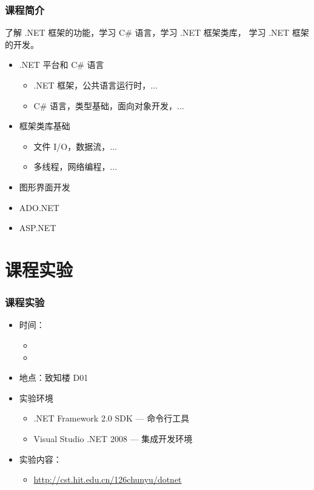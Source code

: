 \begin{frame}
\frametitle{课程简介}

\CJKindent 了解 .NET 框架的功能，学习 C\# 语言，学习 .NET 框架类库， 学习
.NET 框架的开发。

\begin{itemize}
\item .NET 平台和 C\# 语言
\begin{itemize}
\item .NET 框架，公共语言运行时，$\ldots$
\item C\# 语言，类型基础，面向对象开发，$\ldots$
\end{itemize}
\item 框架类库基础
  \begin{itemize}
  \item 文件 I/O，数据流，$\ldots$
  \item 多线程，网络编程，$\ldots$
  \end{itemize}
\item 图形界面开发
\item ADO.NET
\item ASP.NET
\end{itemize}
\end{frame}

\section{课程实验}
\begin{frame}
\frametitle{课程实验}
\begin{itemize}
    \setlength{\itemsep}{14pt plus 1pt}
 \item 时间：%
\begin{itemize}
  \setlength{\itemsep}{6pt plus 1pt}
\item %
\item %
\end{itemize}
\item 地点：致知楼 D01
\item 实验环境
\begin{itemize}
    \setlength{\itemsep}{6pt plus 1pt}
\item .NET Framework 2.0 SDK --- 命令行工具
\item Visual Studio .NET 2008 --- 集成开发环境
\end{itemize}
\item 实验内容：
  \begin{itemize}
  \item \href{http://cst.hit.edu.cn/~chunyu/dotnet}{http://cst.hit.edu.cn/\char126chunyu/dotnet}
  \end{itemize}
\end{itemize}

\end{frame}

